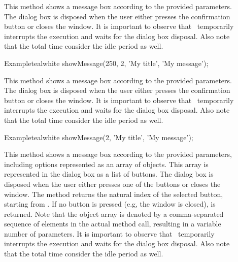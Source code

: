 \begin{description}
\item[]

This method shows a message box according to the provided parameters. The dialog box is disposed when the user either presses the confirmation button or closes the window. It is important to observe that \arara\ temporarily interrupts the execution and waits for the dialog box disposal. Also note that the total time consider the idle period as well.

\begin{codebox}{Example}{teal}{\icnote}{white}
showMessage(250, 2, 'My title', 'My message');
\end{codebox}

\item[]

This method shows a message box according to the provided parameters. The dialog box is disposed when the user either presses the confirmation button or closes the window. It is important to observe that \arara\ temporarily interrupts the execution and waits for the dialog box disposal. Also note that the total time consider the idle period as well.

\begin{codebox}{Example}{teal}{\icnote}{white}
showMessage(2, 'My title', 'My message');
\end{codebox}

\item[]

This method shows a message box according to the provided parameters, including options represented as an array of  objects. This array is represented in the dialog box as a list of buttons. The dialog box is disposed when the user either presses one of the buttons or closes the window. The method returns the natural index of the selected button, starting from . If no button is pressed (e.g, the window is closed),  is returned. Note that the object array is denoted by a  comma-separated sequence of elements in the actual method call, resulting in a variable number of parameters. It is important to observe that \arara\ temporarily interrupts the execution and waits for the dialog box disposal. Also note that the total time consider the idle period as well.


\end{description}
